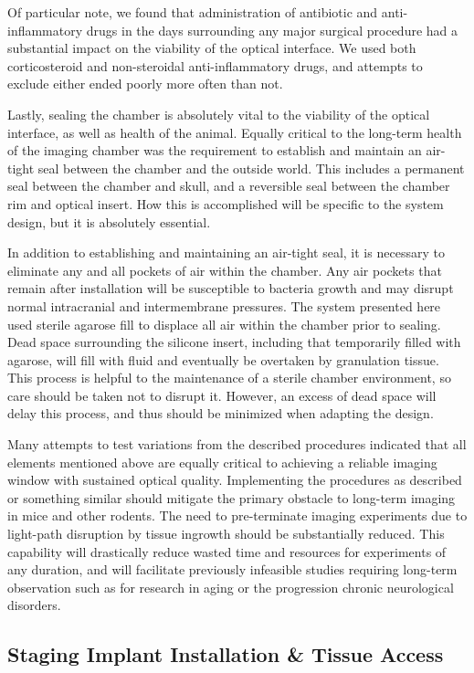 \documentclass[
  12pt,
]{report}
\numberwithin{figure}{section}
\numberwithin{table}{section}
\numberwithin{equations}{section}
\begin{document}
Of particular note, we found that administration of antibiotic and
anti-inflammatory drugs in the days surrounding any major surgical
procedure had a substantial impact on the viability of the optical
interface. We used both corticosteroid and non-steroidal
anti-inflammatory drugs, and attempts to exclude either ended poorly
more often than not.

Lastly, sealing the chamber is absolutely vital to the viability of the
optical interface, as well as health of the animal. Equally critical to
the long-term health of the imaging chamber was the requirement to
establish and maintain an air-tight seal between the chamber and the
outside world. This includes a permanent seal between the chamber and
skull, and a reversible seal between the chamber rim and optical insert.
How this is accomplished will be specific to the system design, but it
is absolutely essential.

In addition to establishing and maintaining an air-tight seal, it is
necessary to eliminate any and all pockets of air within the chamber.
Any air pockets that remain after installation will be susceptible to
bacteria growth and may disrupt normal intracranial and intermembrane
pressures. The system presented here used sterile agarose fill to
displace all air within the chamber prior to sealing. Dead space
surrounding the silicone insert, including that temporarily filled with
agarose, will fill with fluid and eventually be overtaken by granulation
tissue. This process is helpful to the maintenance of a sterile chamber
environment, so care should be taken not to disrupt it. However, an
excess of dead space will delay this process, and thus should be
minimized when adapting the design.

Many attempts to test variations from the described procedures indicated
that all elements mentioned above are equally critical to achieving a
reliable imaging window with sustained optical quality. Implementing the
procedures as described or something similar should mitigate the primary
obstacle to long-term imaging in mice and other rodents. The need to
pre-terminate imaging experiments due to light-path disruption by tissue
ingrowth should be substantially reduced. This capability will
drastically reduce wasted time and resources for experiments of any
duration, and will facilitate previously infeasible studies requiring
long-term observation such as for research in aging or the progression
chronic neurological disorders.

\hypertarget{staging-implant-installation-tissue-access}{%
\subsection{Staging Implant Installation \& Tissue
Access}\label{staging-implant-installation-tissue-access}}
\end{document}
